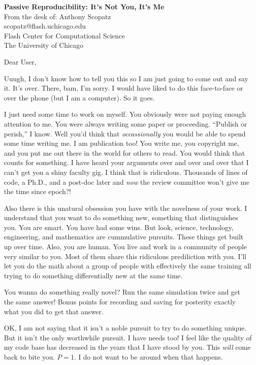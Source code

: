 \documentclass[10pt]{letter}
\begin{document}
\begin{letter}{
{\bf Passive Reproducibility: It's Not You, It's Me}\\
From the desk of: Anthony Scopatz\\
scopatz@flash.uchicago.edu\\
Flash Center for Computational Science\\
The University of Chicago
}


\opening{Dear User,}


Uuugh, I don't know how to tell you this so I am just going to come out and
say it.  It's over.  There, bam, I'm sorry.  I would have liked to do this 
face-to-face or over the phone (but I am a computer).  So it goes.

I just need some time to work on myself.  You obviously were not paying enough 
attention to me.  You were always writing some paper or proceeding.  ``Publish or 
perish,'' I know.  Well you'd think that \emph{occassionally} you would be able 
to spend some time writing me.  I am publication too!  You write me, you copyright
me, and you put me out there in the world for others to read.  You would think that 
counts for something.  I have heard your arguments over and over and over that I 
can't get you a shiny faculty gig.  I think that is ridiculous.  Thousands of 
lines of code, a Ph.D., and a post-doc later and \emph{now} the review committee 
won't give me the time since epoch?!

Also there is this unatural obsession you have with the novelness of your work.
I understand that you want to do something new, something that distinguishes you.
You are smart. You have had some wins.  But look, science, technology, engineering, 
and mathematics are cummulative pursuits.  These things get built up over time.
Also, you are human.  You live and work in a community of people very similar to you.  
Most of them share this ridiculous prediliction with you.  I'll let you do the math
about a group of people with effectively the same training all trying to do something
differentially new at the same time.

You wanna do something really novel?  Run the same simulation twice and get the same
answer!  Bonus points for recording and saving for posterity exactly what you did to
get that answer.

OK, I am not saying that it isn't a noble pursuit to try to do something unique.  
But it isn't the only worthwhile pursuit.  I have needs too!  I feel like the quality
of my code base has decreased in the years that I have stood by you.  This \emph{will}
come back to bite you.  $P=1$. I do not want to be around when that happens.


\end{letter}
\end{document}
